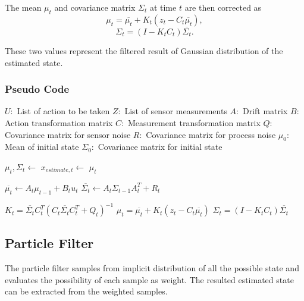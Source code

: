 \documentclass[letterpaper,11pt]{article}
\begin{document}

The mean $\mu_t$ and covariance matrix $\Sigma_t$ at time $t$ are then corrected as
$$\mu_t = \overline{\mu_t} + K_t(z_t - C_t \overline{\mu_t}),$$
$$\Sigma_t = (I - K_tC_t)\overline{\Sigma_t}.$$

These two values represent the filtered result of Gaussian distribution of the estimated state.

\subsubsection{Pseudo Code}
\begin{algorithm}[H]
    \begin{algorithmic}[1]
		\Require $U:$ List of action to be taken
		\Require $Z:$ List of sensor measurements
		\Require $A:$ Drift matrix
		\Require $B:$ Action transformation matrix
		\Require $C:$ Measurement transformation matrix
		\Require $Q:$ Covariance matrix for sensor noise
		\Require $R:$ Covariance matrix for process noise
		\Require $\mu_0:$ Mean of initial state
		\Require $\Sigma_0:$ Covariance matrix for initial state

			 
				\State $\mu_t, \Sigma_t \gets$ 
				\State $x_{estimate,t} \gets$ $\mu_t$ 
			\EndFor
        \EndFunction




		\State
			\State $\overline{\mu_t} \gets A_t \mu_{t-1} + B_t u_t$ 
			\State $\overline{\Sigma_t} \gets A_t \Sigma_{t-1} A_t^T + R_t$

			\State $K_t = \overline{\Sigma_t} C_t^T (C_t \overline{\Sigma_t} C_t^T + Q_t)^{-1}$ 
			\State $\mu_t = \overline{\mu_t} + K_t(z_t - C_t \overline{\mu_t})$
			\State $\Sigma_t = (I - K_tC_t)\overline{\Sigma_t}$
			\State {}
		\EndFunction
      \end{algorithmic}
    \end{algorithm}







\subsection{Particle Filter}
The particle filter samples from implicit distribution of all the possible state and evaluates the possibility of each sample as weight. The resulted estimated state can be extracted from the weighted samples.
\end{document}
